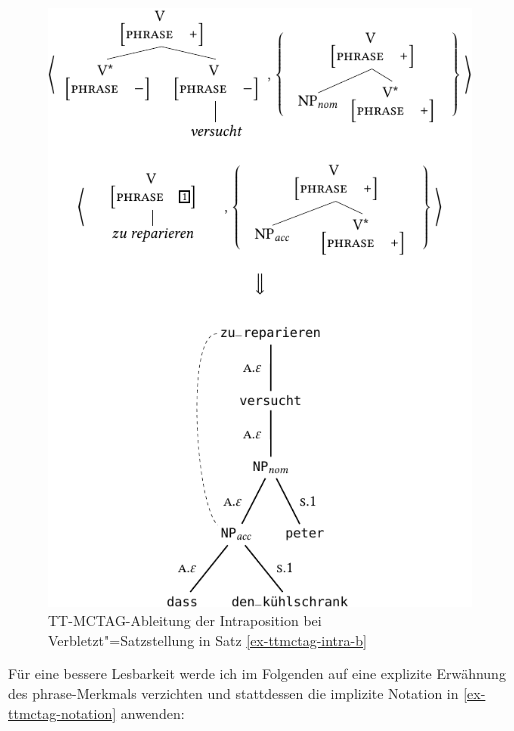 \begin{figure}[p]
\centering
\includegraphics{graphics/abb713.pdf}
\caption{\label{fig-ttmctag-koh2}TT-MCTAG-Ableitung der Intraposition bei Verbletzt"=Satzstellung in Satz \ref{ex-ttmctag-intra-b}}
\end{figure}

Für eine bessere Lesbarkeit werde ich im Folgenden auf eine explizite Erwähnung des {\sc phrase}-Merkmals verzichten und stattdessen die implizite Notation in \ref{ex-ttmctag-notation} anwenden: 

